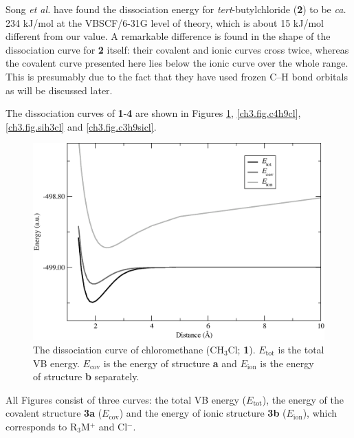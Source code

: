 Song \textit{et al.} \cite{song} have found the dissociation energy for \textit{tert}-butylchloride (\textbf{2}) to be \textit{ca.} 234 kJ/mol at the VBSCF/6-31G level of theory, which is about 15 kJ/mol different from our value.  A remarkable difference is found in the shape of the dissociation curve for \textbf{2} itself: their covalent and ionic curves cross twice, whereas the covalent curve presented here lies below the ionic curve over the whole range. This is presumably due to the fact that they have used frozen C--H bond orbitals as will be discussed later.

The dissociation curves of \textbf{1}-\textbf{4} are shown in Figures \ref{ch3.fig.ch3cl}, \ref{ch3.fig.c4h9cl}, \ref{ch3.fig.sih3cl} and \ref{ch3.fig.c3h9sicl}.
\begin{figure}[ht]
\begin{center}
\includegraphics[scale=0.50]{dissociation/figures/ch3cl_g.eps}
\end{center}
\caption{The dissociation curve of chloromethane (CH$_3$Cl; \textbf{1}). $E_\mathrm{tot}$ is the total VB energy. $E_\mathrm{cov}$ is the energy of structure \textbf{a} and $E_\mathrm{ion}$ is the energy of structure \textbf{b} separately.}
\label{ch3.fig.ch3cl}
\end{figure}
All Figures consist of three curves: the total VB energy ($E_\mathrm{tot}$), the energy of the covalent structure \textbf{3a} ($E_\mathrm{cov}$) and the energy of ionic structure \textbf{3b} ($E_\mathrm{ion}$), which corresponds to R$_3$M$^{+}$ and Cl$^{-}$.

